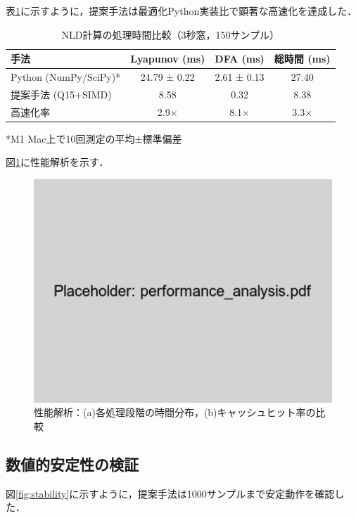 \documentclass[paper]{ieice}
\begin{document}
表\ref{tab:performance}に示すように，提案手法は最適化Python実装比で顕著な高速化を達成した．

\begin{table}[t]
\caption{NLD計算の処理時間比較（3秒窓，150サンプル）}
\label{tab:performance}
\centering
\begin{tabular}{lccc}
\toprule
手法 & Lyapunov (ms) & DFA (ms) & 総時間 (ms) \\
\midrule
Python (NumPy/SciPy)* & 24.79 ± 0.22 & 2.61 ± 0.13 & 27.40 \\
提案手法 (Q15+SIMD) & 8.58 & 0.32 & 8.38 \\
\midrule
高速化率 & 2.9× & 8.1× & 3.3× \\
\bottomrule
\end{tabular}
\vspace{1mm}
\footnotesize{*M1 Mac上で10回測定の平均±標準偏差}
\end{table}

図\ref{fig:performance_analysis}に性能解析を示す．

\begin{figure}[t]
\centering
\includegraphics[width=0.85\linewidth]{performance_analysis.pdf}
\caption{性能解析：(a)各処理段階の時間分布，(b)キャッシュヒット率の比較}
\label{fig:performance_analysis}
\end{figure}

\subsection{数値的安定性の検証}

図\ref{fig:stability}に示すように，提案手法は1000サンプルまで安定動作を確認した．
\end{document}
